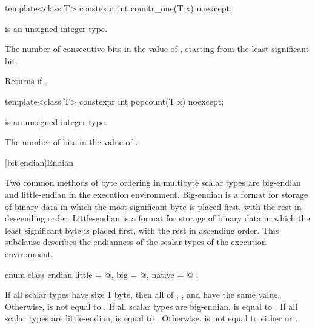 \begin{itemdecl}
template<class T>
  constexpr int countr_one(T x) noexcept;
\end{itemdecl}

%
\begin{itemdescr}
\pnum
\constraints
{} is an unsigned integer type.

\pnum
\returns
The number of consecutive  bits in the value of ,
starting from the least significant bit.
\begin{note}
Returns  if .
\end{note}
\end{itemdescr}

\begin{itemdecl}
template<class T>
  constexpr int popcount(T x) noexcept;
\end{itemdecl}

%
\begin{itemdescr}
\pnum
\constraints
{} is an unsigned integer type.

\pnum
\returns
The number of  bits in the value of .
\end{itemdescr}

[bit.endian]{Endian}

\pnum
Two common methods of byte ordering in multibyte scalar types are big-endian
and little-endian in the execution environment. Big-endian is a format for
storage of binary data in which the most significant byte is placed first,
with the rest in descending order. Little-endian is a format for storage of
binary data in which the least significant byte is placed first, with the rest
in ascending order. This subclause describes the endianness of the scalar types
of the execution environment.

%
%
%
%
\begin{itemdecl}
enum class endian {
  little = @\seebelow@,
  big    = @\seebelow@,
  native = @\seebelow@
};
\end{itemdecl}

\begin{itemdescr}
\pnum
If all scalar types have size 1 byte, then all of ,
, and  have the same value.
Otherwise,  is not equal to .
If all scalar types are big-endian,  is
equal to .
If all scalar types are little-endian,  is
equal to .
Otherwise,  is not equal
to either  or .
\end{itemdescr}

